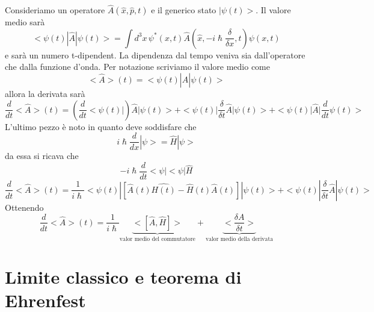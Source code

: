 Consideriamo un operatore $\hat{A}(\hat{x},\hat{p},t)$ e il generico stato $|\psi(t)>$. Il valore medio sarà
\begin{equation*}
    <\psi(t)|\hat{A}|\psi(t)> = \int d^3x \, \psi^*(x,t)\hat{A}\left(\hat{x},-i\hslash \frac{\delta}{\delta x}, t\right)\psi(x,t)
\end{equation*}
e sarà un numero t-dipendent. La dipendenza dal tempo veniva sia dall'operatore che dalla funzione d'onda. Per notazione scriviamo il valore medio come
\begin{equation*}
    <\hat{A}>(t)= <\psi(t)|\hat{A}|\psi(t)>
\end{equation*}
allora la derivata sarà
\begin{equation*}
    \frac{d}{dt} <\hat{A}>(t) = \left(\frac{d}{dt}<\psi(t)|\right) \hat{A}|\psi(t)> + <\psi(t)|\frac{\delta}{\delta t}\hat{A}|\psi(t)> + <\psi(t)|\hat{A}|\frac{d}{dt}\psi(t)>
\end{equation*}
L'ultimo pezzo è noto in quanto deve soddisfare che 
\begin{equation*}
    i\hslash \frac{d}{dx}|\psi> = \hat{H}|\psi>
\end{equation*}
da essa si ricava che 
\begin{equation*}
    -i\hslash \frac{d}{dt}<\psi| <\psi|\hat{H}
\end{equation*}
\begin{equation*}
    \frac{d}{dt} <\hat{A}>(t) = \frac{1}{i\hslash}<\psi(t)| [\hat{A}(t)\hat{H(t)}-\hat{H}(t)\hat{A}(t)]|\psi(t)> + <\psi(t)|\frac{\delta}{\delta t}\hat{A}| \psi(t)>
\end{equation*}
Ottenendo
\begin{equation}
    \label{*}
    \frac{d}{dt} <\hat{A}>(t) = \frac{1}{i\hslash} \underbrace{<[\hat{A},\hat{H}]>}_{\mbox{valor medio del commutatore}} + \underbrace{<\frac{\delta A}{\delta t}>}_{\mbox{valor medio della derivata}}
\end{equation}

\chapter{Limite classico e teorema di Ehrenfest}

